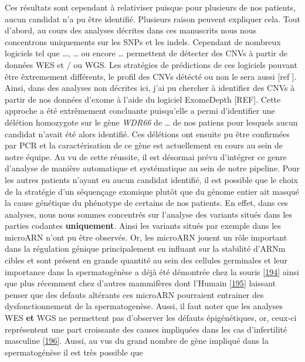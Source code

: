 \documentclass[12pt,twoside]{reedthesis}
\theoremstyle{definition}
\theoremstyle{definition}
\theoremstyle{remark}
\begin{document}
  Ces résultats sont cependant à relativiser puisque pour plusieurs de nos
  patients, aucun candidat n'a pu être identifié. Plusieurs raison peuvent
  expliquer cela. Tout d'abord, au cours des analyses décrites dans ces
  manuscrits nous nous concentrons uniquements sur les SNPs et les indels.
  Cependant de nombreux logiciels tel que \ldots{}, \ldots{} ou encore
  \ldots{} permettent de détecter des CNVs à partir de données WES et / ou
  WGS. Les stratégies de prédictions de ces logiciels pouvant être
  êxtremement différents, le profil des CNVs détécté ou non le sera aussi
  {[}ref {]}. Ainsi, dans des analyses non décrites ici, j'ai pu chercher
  à identifier des CNVs à partir de nos données d'exome à l'aide du
  logiciel ExomeDepth {[}REF{]}. Cette approche a été extrêmement
  concluante puisqu'elle a permi d'identifier une délétion homozygote sur
  le gène \emph{WDR66} de \ldots{} de nos patiens pour lesquels aucun
  candidat n'avait été alors identifié. Ces délétions ont ensuite pu être
  confirmées par PCR et la caractérisation de ce gène est actuellement en
  cours au sein de notre équipe. Au vu de cette réussite, il est désormai
  prévu d'intégrer ce genre d'analyse de manière automatique et
  systématique au sein de notre pipeline. Pour les autres patients n'ayant
  eu aucun candidat identifié, il est possible que le choix de la
  stratégie d'un séquençage exomique plutôt que du génome entier ait
  masqué la cause génétique du phénotype de certains de nos patients. En
  effet, dans ces analyses, nous nous sommes concentrés sur l'analyse des
  variants situés dans les parties codantes \textbf{uniquement}. Ainsi les
  variants situés par exemple dans les microARN n'ont pu être observés.
  Or, les microARN jouent un rôle important dans la régulation génique
  principalement en influant sur la stabilité d'ARNm cibles et sont
  présent en grande quantité au sein des cellules germinales et leur
  importance dans la spermatogénèse a déjà été démontrée chez la souris
  {[}\protect\hyperlink{ref-Comazzetto2014}{194}{]} ainsi que plus
  récemment chez d'autres mammifères dont l'Humain
  {[}\protect\hyperlink{ref-Chen2017}{195}{]} laissant penser que des
  defauts altérants ces microARN pourraient entrainer des
  dysfonctionnement de la spermatogenèse. Aussi, il faut noter que les
  analyses WES \textbf{et} WGS ne permettent pas d'observer les défauts
  épigénétiques, or, ceux-ci représentent une part croissante des causes
  impliquées dans les cas d'infertilité masculine
  {[}\protect\hyperlink{ref-Carrell2011}{196}{]}. Aussi, au vus du grand
  nombre de gène impliqué dans la spermatogénèse il est très possible que
\end{document}
